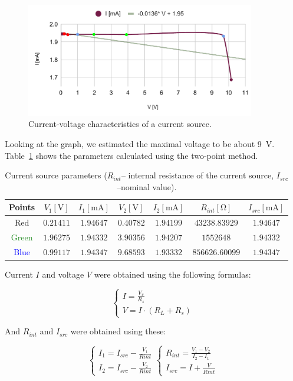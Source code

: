 \begin{figure}[H]
	\centering
	\includegraphics[width=10cm]{schematics/chart5.pdf}
	\caption{Current-voltage characteristics of a current source. }
	\label{fig:currcurr}
\end{figure}


Looking at the graph, we estimated the maximal voltage to be about \SI{9}{\volt}. Table~\ref{tab:kupa} shows the parameters calculated using the two-point method.

\begin{table}[H]
	\centering
	\begin{tabular}{ c | c | c | c | c | c | c}
		Points & $V_1 [\unit{\volt}]$ & $I_1 [\unit{\milli\ampere}]$ & $V_2 [\unit{\volt}]$ & $I_2 [\unit{\milli\ampere}]$ & $R_{int} [\unit{\ohm}]$ & $I_{src} [\unit{\milli\ampere}]$ \\
		\hline
		\textcolor{BrickRed}{Red} & $0.21411$ & $1.94647$ & $0.40782$ & $1.94199$ & $43238.83929$ & $1.94647$ \\
		\textcolor{ForestGreen}{Green} & $1.96275$ & $1.94332$ & $3.90356$ & $1.94207$ & $1552648$ & $1.94332$ \\
		\textcolor{blue}{Blue} & $0.99117$ & $1.94347$ & $9.68593$ & $1.93332$ & $856626.60099$ & $1.94347$ \\
	\end{tabular}
	\caption{Current source parameters ($R_{int}$-- internal resistance of the current source, $I_{src}$--nominal value).}
	\label{tab:kupa}
\end{table}

Current $I $ and voltage $V$ were obtained using the following formulas:
 
 
 \begin{equation}
 	\begin{cases}
 		I = \frac{V_v}{R_s}\\
 		V = I\cdot(R_L + R_s)
 	\end{cases}
 \end{equation}
 
And $R_{int}$ and $I_{src}$ were obtained using these:

\begin{equation}
	\begin{cases}
		I_1 =I_{src}- \frac{V_1}{R{int}}\\
		I_2 =I_{src}- \frac{V_2}{R{int}}
	\end{cases}
	\begin{cases}
		R_{int} = \frac{V_1-V_2}{I_2-I_1}\\
		I_{src} = I +\frac{V}{R{int}}
	\end{cases}
	\label{eq:dupa}
\end{equation}



